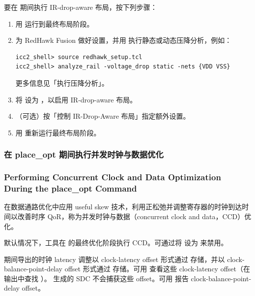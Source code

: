 要在  期间执行 IR-drop-aware 布局，按下列步骤：
\begin{enumerate}
  \item 用  运行到最终布局阶段。
  \item 为 RedHawk Fusion 做好设置，并用  执行静态或动态压降分析，例如：
\begin{lstlisting}
icc2_shell> source redhawk_setup.tcl
icc2_shell> analyze_rail -voltage_drop static -nets {VDD VSS}
\end{lstlisting}
        更多信息见「执行压降分析」。
  \item 将  设为 ，以启用 IR-drop-aware 布局。
  \item （可选）按「控制 IR-Drop-Aware 布局」指定额外设置。
  \item 用  重新运行最终布局阶段。
\end{enumerate}

\subsubsection{在 place\_opt 期间执行并发时钟与数据优化}
\subsubsection*{Performing Concurrent Clock and Data Optimization During the place\_opt Command}

在数据通路优化中应用 useful skew 技术，利用正松弛并调整寄存器的时钟到达时间以改善时序 QoR，称为并发时钟与数据（concurrent clock and data，CCD）优化。

默认情况下，工具在  的最终优化阶段执行 CCD。可通过将  设为  来禁用。

 期间导出的时钟 latency 调整以 clock-latency offset 形式通过  存储，并以 clock-balance-point-delay offset 形式通过  存储。可用  查看这些 clock-latency offset（在输出中查找 ）。 生成的 SDC 不会捕获这些 offset。可用  报告 clock-balance-point-delay offset。

